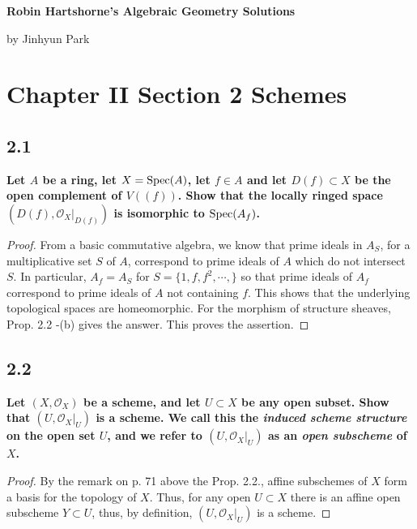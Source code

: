 \documentclass[11pt]{amsart}          %
\newcommand{\calO}{\mathcal{O}}
\newcommand{\spec}{{\rm Spec}}
\begin{document}
\begin{center}
\bf
\large Robin Hartshorne's Algebraic Geometry Solutions
\end{center}
\begin{center}
by Jinhyun Park
\end{center}
\vskip0.5cm

\section*{Chapter II Section 2 Schemes}

\subsection*{2.1}\textbf{Let $A$ be a ring, let $X = \spec (A)$, let $f \in A$ and let $D(f) \subset X$ be the open complement of $V((f))$. Show that the locally ringed space $(D(f), \calO_X |_{D(f)} )$ is isomorphic to $\spec (A_f)$.}

\begin{proof} From a basic commutative algebra, we know that prime ideals in $A_S$, for a multiplicative set $S$ of $A$, correspond to prime ideals of $A$ which do not intersect $S$. In particular, $A_f = A_S$ for $S = \{ 1, f, f^2, \cdots, \}$ so that prime ideals of $A_f$ correspond to prime ideals of $A$ not containing $f$. This shows that the underlying topological spaces are homeomorphic. For the morphism of structure sheaves, Prop. 2.2 -(b) gives the answer. This proves the assertion. \end{proof}

\subsection*{2.2}\textbf{Let $(X, \calO_X)$ be a scheme, and let $U \subset X$ be any open subset. Show that $(U, \calO_{X} |_U)$ is a scheme. We call this the {\it induced scheme structure} on the open set $U$, and we refer to $(U, \calO_X |_U)$ as an {\it open subscheme} of $X$.}

\begin{proof}By the remark on p. 71 above the Prop. 2.2., affine subschemes of $X$ form a basis for the topology of $X$. Thus, for any open $U \subset X$ there is an affine open subscheme $Y \subset U$, thus, by definition, $(U, \calO_X |_U)$ is a scheme.\end{proof}
\end{document}
